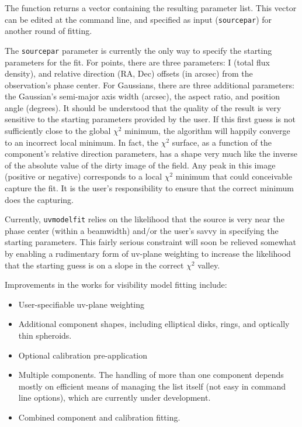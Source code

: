 The function returns a vector containing the resulting parameter list.
This vector can be edited at the command line, and specified as input
({\tt sourcepar}) for another round of fitting.

The {\tt sourcepar} parameter is currently the only way to specify the
starting parameters for the fit.  For points, there are three
parameters: I (total flux density), and relative direction (RA, Dec)
offsets (in arcsec) from the observation's phase center.  For
Gaussians, there are three additional parameters: the Gaussian's
semi-major axis width (arcsec), the aspect ratio, and position angle
(degrees).  It should be understood that the quality of the result is
very sensitive to the starting parameters provided by the user.  If
this first guess is not sufficiently close to the global $\chi^2$
minimum, the algorithm will happily converge to an incorrect local
minimum.  In fact, the $\chi^2$ surface, as a function of the
component's relative direction parameters, has a shape very much like
the inverse of the absolute value of the dirty image of the field.
Any peak in this image (positive or negative) corresponds to a local
$\chi^2$ minimum that could conceivable capture the fit.  It is the
user's responsibility to ensure that the correct minimum does the
capturing.

Currently, {\tt uvmodelfit} relies on the likelihood that the source
is very near the phase center (within a beamwidth) and/or the user's
savvy in specifying the starting parameters.  This fairly serious
constraint will soon be relieved somewhat by enabling a rudimentary
form of uv-plane weighting to increase the likelihood that the
starting guess is on a slope in the correct $\chi^2$ valley.

Improvements in the works for visibility model fitting include:

\begin{itemize}
   \item User-specifiable uv-plane weighting
   \item Additional component shapes, including elliptical disks, rings,
         and optically thin spheroids.
   \item Optional calibration pre-application
   \item Multiple components.  The handling of more than one component
         depends mostly on efficient means of managing the list itself (not easy in
         command line options), which are currently under development.
   \item Combined component and calibration fitting.
\end{itemize}


